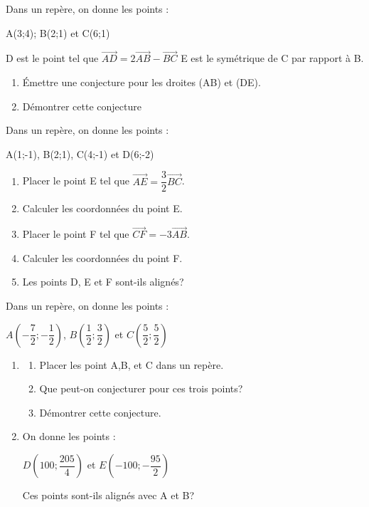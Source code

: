 {\begin{Exercice}
 Dans un repère, on donne les points :
\begin{center}
A(3;4); B(2;1) et C(6;1)
\end{center}
D est le point tel que $ \overrightarrow{AD} = 2\overrightarrow{AB}-\overrightarrow{BC} $
E est le symétrique de C par rapport à B.
\begin{enumerate}
	\item Émettre une conjecture pour les droites (AB) et (DE).
	\item Démontrer cette conjecture
\end{enumerate}
\end{Exercice}

\begin{Exercice}
 Dans un repère, on donne les points :
\begin{center}
A(1;-1), B(2;1), C(4;-1) et D(6;-2)
\end{center}
\begin{enumerate}
	\item Placer le point E tel que $ \overrightarrow{AE} = \dfrac{3}{2}\overrightarrow{BC} $.
	\item Calculer les coordonnées du point E.
	\item Placer le point F tel que $ \overrightarrow{CF} = -3\overrightarrow{AB}$.
	\item Calculer les coordonnées du point F.
	\item Les points D, E et F sont-ils alignés?
\end{enumerate}
\end{Exercice}


\begin{Exercice}
Dans un repère, on donne les points :
\begin{center}
$ A\left(- \dfrac{7}{2};- \dfrac{1}{2} \right)  $, $ B\left( \dfrac{1}{2};\dfrac{3}{2} \right)  $ et $ C\left( \dfrac{5}{2};\dfrac{5}{2} \right)  $
\end{center}
\begin{enumerate}
	\item\begin{enumerate}
	\item Placer les point A,B, et C dans un repère.
\item Que peut-on conjecturer pour ces trois points?
\item Démontrer cette conjecture.
\end{enumerate}
\item On donne les points :
\begin{center}
$ D\left( 100; \dfrac{205}{4}\right)  $ et $ E\left( -100; -\dfrac{95}{2}\right)  $
\end{center}
Ces points sont-ils alignés avec A et B?
\end{enumerate}
\end{Exercice}

}
